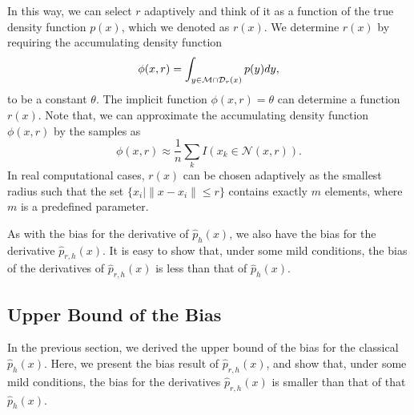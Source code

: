 \documentclass[aos,preprint]{imsart}
\theoremstyle{remark}
\begin{document}
In this way, we can select $r$ adaptively and think of it as a function of the true density function $p(x)$, which we denoted as $r(x)$. We determine $r(x)$ by requiring the accumulating density function 
\[
\phi(x,r) = \int_{y\in {\cal M}\cap {\mathcal D}_r(x)} p(y) dy,
\] 
to be a constant $\theta$. %
The implicit function $\phi(x,r)=\theta$ can determine a function $r(x)$.
Note that,  we can approximate the accumulating density function $\phi(x,r)$  by the samples as
\[
\phi(x,r) \approx \frac{1}{n} \sum_k I(x_k\in {\mathcal N}(x,r)).
\]
In real computational cases, $r(x)$ can be chosen adaptively as the smallest radius such that the set $\{x_i | \|x-x_i\|\leq r\}$ contains exactly $m$ elements, where $m$ is a predefined parameter.

As with the bias for the derivative of $\hat{p}_h(x)$, we also have the bias for the derivative $\hat{p}_{r,h}(x)$. It is easy to show that, under some mild conditions, the bias of the derivatives of $\hat{p}_{r,h}(x)$ is less than that of $\hat{p}_h(x)$.
\subsection{Upper Bound of the Bias}
In the previous section, we derived the upper bound of the bias for the classical $\hat{p}_h(x)$. Here, we present the bias result of $\hat{p}_{r,h}(x)$, and show that, under some mild conditions, the bias for the derivatives $\hat{p}_{r,h}(x)$ is smaller than that of that $\hat{p}_h(x)$.
\end{document}
